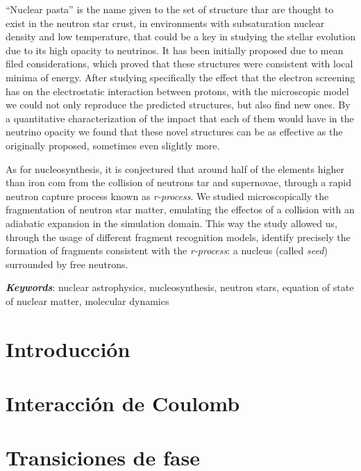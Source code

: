 \documentclass[12pt]{book}
\begin{document}
``Nuclear pasta'' is the name given to the set of structure thar are thought to exist in the neutron star crust, in environments with subsaturation nuclear density and low temperature, that could be a key in studying the stellar evolution due to its high opacity to neutrinos.
It has been initially proposed due to mean filed considerations, which proved that these structures were consistent with local minima of energy.
After studying specifically the effect that the electron screening has on the electrostatic interaction between protons, with the microscopic model we could not only reproduce the predicted structures, but also find new ones.
By a quantitative characterization of the impact that each of them would have in the neutrino opacity we found that these novel structures can be as effective as the originally proposed, sometimes even slightly more.

As for nucleosynthesis, it is conjectured that around half of the elements higher than iron com from the collision of neutrons tar and supernovae, through a rapid neutron capture process known as \emph{r-process}.
We studied microscopically the fragmentation of neutron star matter, emulating the effectos of a collision with an adiabatic expansion in the simulation domain.
This way the study allowed us, through the usage of different fragment recognition models, identify precisely the formation of fragments consistent with the \emph{r-process}: a nucleus (called \emph{seed}) surrounded by free neutrons.

\emph{\textbf{Keywords}}: nuclear astrophysics, nucleosynthesis, neutron stars, equation of state of nuclear matter, molecular dynamics

\tableofcontents
\mainmatter
\chapter[Introducción]{Introducción}
\label{ch:introduccion}



\chapter[Efecto de Coulomb]{Interacción de Coulomb}
\label{ch:coulomb}


\chapter[Transiciones de fase]{Transiciones de fase}
\label{ch:transicion}

\end{document}
